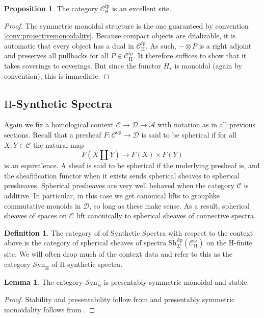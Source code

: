 \documentclass[10pt]{amsart}
\theoremstyle{definition}
\numberwithin{figure}{section}
\numberwithin{equation}{section}
\newtheorem{lemma}[figure]{Lemma}
\newtheorem{proposition}[figure]{Proposition}
\newtheorem{definition}[figure]{Definition}
\newcommand{\op}{\mathrm{op}}
\newcommand{\cA}{\mathcal{A}}
\newcommand{\cC}{\mathcal{C}}
\newcommand{\cD}{\mathcal{D}}
\theoremstyle{cited}
\newcommand{\Sp}{{\mathcal{S}\mathrm{p}}}
\newcommand{\Sh}{\mathrm{Sh}}
\newcommand{\fp}{\mathrm{fp}}
\newcommand{\Syn}{\mathcal{S}\mathrm{yn}}
\renewcommand{\H}{\mathrm{H}}
\begin{document}
\begin{proposition}
  The category $\cC^\fp_\H$ is an excellent site.
\end{proposition}

\begin{proof}
  The symmetric monoidal structure is the one guaranteed by convention \ref{conv:projectivemonoidality}. Because compact objects are dualizable, it is automatic that every object has a dual in $\cC^\fp_\H$. As such, $-\otimes P$ is a right adjoint and preserves all pullbacks for all $P\in \cC^\fp_\H$. It therefore suffices to show that it takes coverings to coverings. But since the functor $H_\star$ is monoidal (again by convention), this is immediate.
\end{proof}

\subsection{$\H$-Synthetic Spectra}

Again we fix a homological context $\cC\to \cD\to \cA$ with notation as in all previous sections. Recall that a presheaf $F:\cC^\op\to \cD$ is said to be spherical if for all $X,Y\in \cC$ the natural map
\[
F(X\amalg Y)\to F(X)\times F(Y)
\]
is an equivalence. A sheaf is said to be spherical if the underlying presheaf is, and the sheafification functor when it exists sends spherical sheaves to spherical presheaves. Spherical presheaves are very well behaved when the category $\cC$ is additive. In particular, in this case we get canonical lifts to grouplike commutative monoids in $\cD$, so long as these make sense. As a result, spherical sheaves of spaces on $\cC$ lift canonically to spherical sheaves of connective spectra.

\begin{definition}\label{def:synsp}
  The category of of Synthetic Spectra with respect to the context above is the category of spherical sheaves of spectra $\Sh^\Sp_\Sigma(\cC^\omega_\H)$ on the $\H$-finite site. We will often drop much of the context data and refer to this as the category $\Syn_\H$ of $\H$-synthetic spectra.
\end{definition}

\begin{lemma}\label{lem:synispsms}
  The category $\Syn_\H$ is presentably symmetric monoidal and stable.
\end{lemma}

\begin{proof}
  Stability and presentability follow from \cite[Corollary 2.13]{Pst22} and presentably symmetric monoidality follows from \cite[Proposition 2.30]{Pst22}.
\end{proof}
\end{document}
